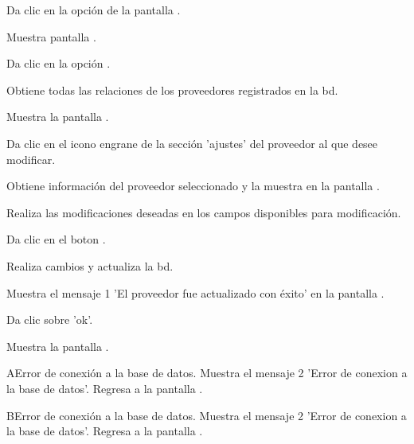 \begin{UCtrayectoria}
	
	\UCpaso[\UCactor] Da clic en la opción  de la pantalla .

	\UCpaso[\UCsist] Muestra pantalla .

	\UCpaso[\UCactor] Da clic en la opción .

	\UCpaso[\UCsist] Obtiene todas las relaciones de los proveedores registrados en la bd. 

	\UCpaso[\UCsist] Muestra la pantalla .

	\UCpaso[\UCactor] Da clic en el icono engrane de la sección 'ajustes' del proveedor al que desee modificar.

	\UCpaso[\UCsist] Obtiene información del proveedor seleccionado y la muestra en la pantalla . 

	\UCpaso[\UCactor] Realiza las modificaciones deseadas en los campos disponibles para modificación.  

	\UCpaso[\UCactor] Da clic en el boton . 

	\UCpaso[\UCsist] Realiza cambios y actualiza la bd. 

	\UCpaso[\UCsist] Muestra el mensaje 1 'El proveedor fue actualizado con éxito' en la pantalla .

	\UCpaso[\UCactor] Da clic sobre 'ok'.

	\UCpaso[\UCsist] Muestra la pantalla .
	
\end{UCtrayectoria}


\begin{UCtrayectoriaA}{A}{Error de conexión a la base de datos.}
	\UCpaso[\UCsist] Muestra el mensaje 2 'Error de conexion a la base de datos'.			
	\UCpaso[\UCsist] Regresa a la pantalla .
\end{UCtrayectoriaA}

\begin{UCtrayectoriaA}{B}{Error de conexión a la base de datos.}
	\UCpaso[\UCsist] Muestra el mensaje 2 'Error de conexion a la base de datos'.			
	\UCpaso[\UCsist] Regresa a la pantalla .
\end{UCtrayectoriaA}

